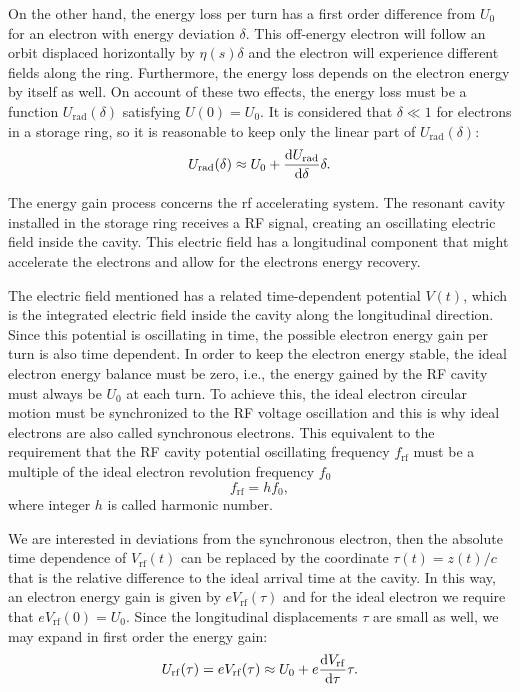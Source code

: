 On the other hand, the energy loss per turn has a first order difference from $U_0$ for an electron with energy deviation $\delta$. This off-energy electron will follow an orbit displaced horizontally by $\eta(s)\delta$ and the electron will experience different fields along the ring. Furthermore, the energy loss depends on the electron energy by itself as well. On account of these two effects, the energy loss must be a function $U_{\mathrm{rad}}(\delta)$ satisfying $U(0) = U_0$. It is considered that $\delta \ll 1$ for electrons in a storage ring, so it is reasonable to keep only the linear part of $U_{\mathrm{rad}}(\delta)$:
\begin{equation}
    U_{\mathrm{rad}}(\delta) \approx U_0 + \dfrac{\mathrm{d} U_{\mathrm{rad}}}{\mathrm{d} \delta}\delta.
    \label{approx1}
\end{equation}

The energy gain process concerns the \gls{rf} accelerating system. The resonant cavity installed in the storage ring receives a RF signal, creating an oscillating electric field inside the cavity. This electric field has a longitudinal component that might accelerate the electrons and allow for the electrons energy recovery.

The electric field mentioned has a related time-dependent potential $V(t)$, which is the integrated electric field inside the cavity along the longitudinal direction. Since this potential is oscillating in time, the possible electron energy gain per turn is also time dependent. In order to keep the electron energy stable, the ideal electron energy balance must be zero, i.e., the energy gained by the RF cavity must always be $U_0$ at each turn. To achieve this, the ideal electron circular motion must be synchronized to the RF voltage oscillation and this is why ideal electrons are also called synchronous electrons. This equivalent to the requirement that the RF cavity potential oscillating frequency $f_{\mathrm{rf}}$ must be a multiple of the ideal electron revolution frequency $f_0$
\begin{equation}
    f_{\mathrm{rf}} = h f_0,
\end{equation}
where integer $h$ is called harmonic number.

We are interested in deviations from the synchronous electron, then the absolute time dependence of $V_{\mathrm{rf}}(t)$ can be replaced by the coordinate $\tau(t) = z(t)/c$ that is the relative difference to the ideal arrival time at the cavity. In this way, an electron energy gain is given by $eV_{\mathrm{rf}}(\tau)$ and for the ideal electron we require that $eV_{\mathrm{rf}}(0) = U_0$. Since the longitudinal displacements $\tau$ are small as well, we may expand in first order the energy gain:
\begin{equation}
    U_{\mathrm{rf}}(\tau) = eV_{\mathrm{rf}}(\tau) \approx U_0 + e\dfrac{\mathrm{d} V_{\mathrm{rf}}}{\mathrm{d} \tau}\tau.
    \label{approx2}
\end{equation}

